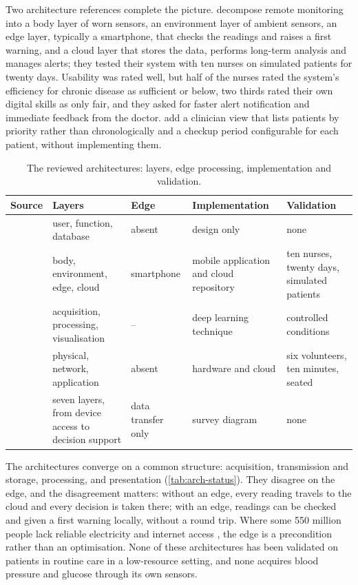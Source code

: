 Two architecture references complete the picture. \Textcite{mucchi2021} decompose remote monitoring into a body layer of worn sensors, an environment layer of ambient sensors, an edge layer, typically a smartphone, that checks the readings and raises a first warning, and a cloud layer that stores the data, performs long-term analysis and manages alerts; they tested their system with ten nurses on simulated patients for twenty days. Usability was rated well, but half of the nurses rated the system's efficiency for chronic disease as sufficient or below, two thirds rated their own digital skills as only fair, and they asked for faster alert notification and immediate feedback from the doctor. \Textcite{yazdani2018} add a clinician view that lists patients by priority rather than chronologically and a checkup period configurable for each patient, without implementing them.

\begin{table}[htbp]
\centering\footnotesize
\caption{The reviewed architectures: layers, edge processing, implementation and validation.}\label{tab:arch-status}\label{tab:layer-mapping}
\begin{tabularx}{\textwidth}{@{}>{\raggedright\arraybackslash}p{2.5cm} >{\raggedright\arraybackslash}X >{\raggedright\arraybackslash}p{2.1cm} >{\raggedright\arraybackslash}p{2.6cm} >{\raggedright\arraybackslash}p{2.9cm}@{}}
\toprule
\textbf{Source} & \textbf{Layers} & \textbf{Edge} & \textbf{Implementation} & \textbf{Validation} \\
\midrule
\textcite{yazdani2018} & user, function, database & absent & design only & none \\
\textcite{mucchi2021} & body, environment, edge, cloud & smartphone & mobile application and cloud repository & ten nurses, twenty days, simulated patients \\
\textcite{tai2024} & acquisition, processing, visualisation & -- & deep learning technique & controlled conditions \\
\textcite{efendi2025} & physical, network, application & absent & hardware and cloud & six volunteers, ten minutes, seated \\
\textcite{liu2025review} & seven layers, from device access to decision support & data transfer only & survey diagram & none \\
\bottomrule
\end{tabularx}
\end{table}

The architectures converge on a common structure: acquisition, transmission and storage, processing, and presentation (\cref{tab:arch-status}). They disagree on the edge, and the disagreement matters: without an edge, every reading travels to the cloud and every decision is taken there; with an edge, readings can be checked and given a first warning locally, without a round trip. Where some 550 million people lack reliable electricity and internet access \parencite{segun2025}, the edge is a precondition rather than an optimisation. None of these architectures has been validated on patients in routine care in a low-resource setting, and none acquires blood pressure and glucose through its own sensors.


